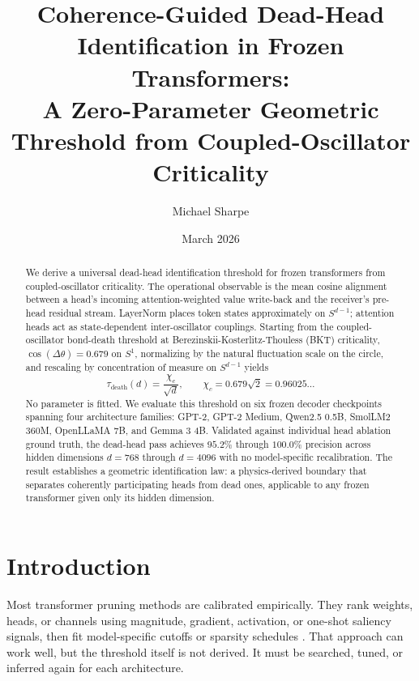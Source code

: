 \documentclass[aps,prd,onecolumn,superscriptaddress,showpacs,12pt]{revtex4-2}
\newcommand{\taudeath}{\tau_{\mathrm{death}}}
\newcommand{\chic}{\chi_c}
\begin{document}
\title{Coherence-Guided Dead-Head Identification in Frozen Transformers:\\
A Zero-Parameter Geometric Threshold from Coupled-Oscillator Criticality}

\author{Michael Sharpe}

\date{March 2026}

\begin{abstract}
We derive a universal dead-head identification threshold for frozen transformers
from coupled-oscillator criticality. The operational observable is the mean cosine
alignment between a head's incoming attention-weighted value write-back and the
receiver's pre-head residual stream. LayerNorm places token states approximately
on $S^{d-1}$; attention heads act as state-dependent inter-oscillator couplings.
Starting from the coupled-oscillator bond-death threshold at
Berezinskii-Kosterlitz-Thouless (BKT) criticality,
$\cos(\Delta \theta) = 0.679$ on $S^1$, normalizing by the natural fluctuation
scale on the circle, and rescaling by concentration of measure on $S^{d-1}$ yields
\begin{equation}
\boxed{\taudeath(d) = \frac{\chic}{\sqrt{d}}}, \qquad \chic = 0.679\sqrt{2} = 0.96025\ldots
\end{equation}
No parameter is fitted. We evaluate this threshold on six frozen decoder
checkpoints spanning four architecture families: GPT-2, GPT-2 Medium, Qwen2.5 0.5B,
SmolLM2 360M, OpenLLaMA 7B, and Gemma 3 4B. Validated against individual head
ablation ground truth, the dead-head pass achieves $95.2\%$ through $100.0\%$
precision across hidden dimensions $d=768$ through $d=4096$ with no
model-specific recalibration. The result establishes a geometric identification
law: a physics-derived boundary that separates coherently participating heads
from dead ones, applicable to any frozen transformer given only its hidden
dimension.
\end{abstract}

\maketitle

\section{Introduction}

Most transformer pruning methods are calibrated empirically. They rank weights,
heads, or channels using magnitude, gradient, activation, or one-shot saliency
signals, then fit model-specific cutoffs or sparsity schedules
\cite{Michel2019,MovementPruning2020,SparseGPT2023,Wanda2023,LLMPruner2023,FLAP2023,ShortGPT2024}.
That approach can work well, but the threshold itself is not derived. It must be
searched, tuned, or inferred again for each architecture.
\end{document}
